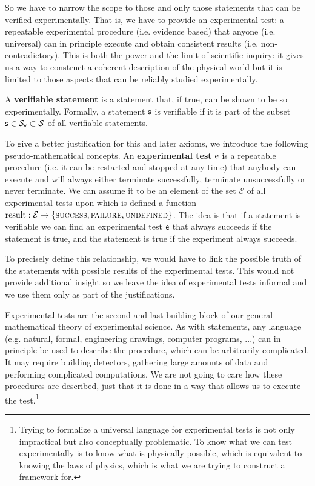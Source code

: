 \documentclass[11pt,letterpaper,fleqn]{memoir} %
\begin{document}
So we have to narrow the scope to those and only those statements that can be verified experimentally. That is, we have to provide an experimental test: a repeatable experimental procedure (i.e. evidence based) that anyone (i.e. universal) can in principle execute and obtain consistent results (i.e. non-contradictory). This is both the power and the limit of scientific inquiry: it gives us a way to construct a coherent description of the physical world but it is limited to those aspects that can be reliably studied experimentally.

\begin{mathSection}
\begin{axiom}\label{ax_verifiable_statements}
	A \textbf{verifiable statement} is a statement that, if true, can be shown to be so experimentally. Formally, a statement $\mathsf{s}$ is verifiable if it is part of the subset $\mathsf{s} \in \mathcal{S}_\textsf{v} \subset \mathcal{S}$ of all verifiable statements.
\end{axiom}
\begin{justification}
	To give a better justification for this and later axioms, we introduce the following pseudo-mathematical concepts. An \textbf{experimental test} $\mathsf{e}$ is a repeatable procedure (i.e. it can be restarted and stopped at any time) that anybody can execute and will always either terminate successfully, terminate unsuccessfully or never terminate. We can assume it to be an element of the set $\mathcal{E}$ of all experimental tests upon which is defined a function $\operatorname{result}: \mathcal{E} \to \{\textsc{success}, \textsc{failure}, \textsc{undefined}\}$. The idea is that if a statement is verifiable we can find an experimental test $\mathsf{e}$ that always succeeds if the statement is true, and the statement is true if the experiment always succeeds.
	
	To precisely define this relationship, we would have to link the possible truth of the statements with possible results of the experimental tests. This would not provide additional insight so we leave the idea of experimental tests informal and we use them only as part of the justifications.
\end{justification}
\end{mathSection}

Experimental tests are the second and last building block of our general mathematical theory of experimental science. As with statements, any language (e.g. natural, formal, engineering drawings, computer programs, ...) can in principle be used to describe the procedure, which can be arbitrarily complicated. It may require building detectors, gathering large amounts of data and performing complicated computations. We are not going to care how these procedures are described, just that it is done in a way that allows us to execute the test.\footnote{Trying to formalize a universal language for experimental tests is not only impractical but also conceptually problematic. To know what we can test experimentally is to know what is physically possible, which is equivalent to knowing the laws of physics, which is what we are trying to construct a framework for.}
\end{document}
